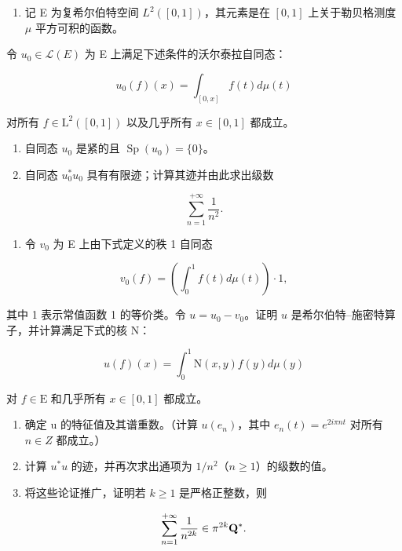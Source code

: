 \begin{enumerate}
\def\labelenumi{\arabic{enumi})}
\setcounter{enumi}{8}
\tightlist
\item
  记 E 为复希尔伯特空间 \(L^{2}([0,1])\)，其元素是在 \([0,1]\) 上关于勒贝格测度 \(\mu\) 平方可积的函数。
\end{enumerate}

令 \(u_{0} \in \mathcal{L}(E)\) 为 E 上满足下述条件的沃尔泰拉自同态：

\[
u _ {0} (f) (x) = \int_ {[ 0, x ]} f (t) d \mu (t)
\]

对所有 \(f \in \mathrm{L}^2([0,1])\) 以及几乎所有 \(x \in [0,1]\) 都成立。

\begin{enumerate}
\def\labelenumi{\alph{enumi})}
\item
  自同态 \(u_{0}\) 是紧的且 \(\operatorname{Sp}(u_{0})=\{0\}\)。
\item
  自同态 \(u_0^* u_0\) 具有有限迹；计算其迹并由此求出级数
\end{enumerate}

\[
\sum_ {n = 1} ^ {+ \infty} \frac {1}{n ^ {2}}.
\]

\begin{enumerate}
\def\labelenumi{\alph{enumi})}
\setcounter{enumi}{2}
\tightlist
\item
  令 \(v_{0}\) 为 E 上由下式定义的秩 1 自同态
\end{enumerate}

\[
v _ {0} (f) = \left(\int_ {0} ^ {1} f (t) d \mu (t)\right) \cdot 1,
\]

其中 1 表示常值函数 1 的等价类。令 \(u = u_0 - v_0\)。证明 \(u\) 是希尔伯特–施密特算子，并计算满足下式的核 N：

\[
u (f) (x) = \int_ {0} ^ {1} \mathrm{N} (x, y) f (y) d \mu (y)
\]

对 \(f \in \mathrm{E}\) 和几乎所有 \(x \in [0,1]\) 都成立。

\begin{enumerate}
\def\labelenumi{\alph{enumi})}
\setcounter{enumi}{3}
\item
  确定 u 的特征值及其谱重数。（计算 \(u(e_{n})\)，其中 \(e_{n}(t) = e^{2i\pi nt}\) 对所有 \(n \in Z\) 都成立。）
\item
  计算 \(u^{*}u\) 的迹，并再次求出通项为 \(1/n^{2}\)（\(n \geqslant 1\)）的级数的值。
\item
  将这些论证推广，证明若 \(k \geqslant 1\) 是严格正整数，则
\end{enumerate}

\[
\sum_ {n = 1} ^ {+ \infty} \frac {1}{n ^ {2 k}} \in \pi^ {2 k} {\bf Q} ^ {*}.
\]

